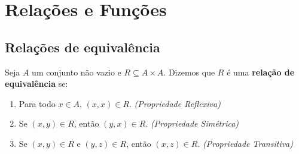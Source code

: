 \chapter{Rela{\c c}{\~o}es e Fun{\c c}{\~o}es}



\section{Rela{\c c}{\~o}es de equival{\^e}ncia}

\begin{definicao}
	Seja $A$ um conjunto n{\~a}o vazio e $R\subseteq A \times A$. Dizemos que $R$ {\'e} uma \textbf{rela{\c c}{\~a}o de equival{\^e}ncia} se:
	\begin{enumerate}[label={\roman*})]
		\item Para todo $x \in A$, $(x,x) \in R$. \textit{(Propriedade Reflexiva)}
		\item Se $(x, y) \in R$, então $(y, x) \in R$. \textit{(Propriedade Simétrica)}
		\item Se $(x, y) \in R$ e $(y, z) \in R$, então $(x, z)\in R$. \textit{(Propriedade Transitiva)}
	\end{enumerate}
\end{definicao}

